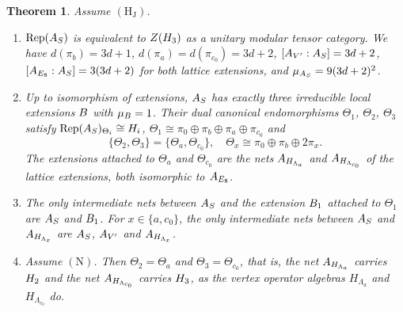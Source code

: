 \documentclass[leqno]{article}
\let\cal\relax
\newcommand{\cal}{\mathcal}
\DeclareMathOperator{\Rep}{Rep} %
\newtheorem{thm}{Theorem}[section]
\numberwithin{equation}{section}
\begin{document}
\begin{thm}
\label{thm:consequences}
Assume $\mathrm{(H_J)}$.
\begin{enumerate}
\item $\Rep(\cal A_S)$ is equivalent to $Z(\cal H_3)$ as a unitary modular tensor category. We have $d(\pi_b) = 3d+1$, $d(\pi_a) = d(\pi_{c_0}) = 3d+2$, $[\cal A_{V'} : \cal A_S] = 3d+2$, $[\cal A_{E_8} : \cal A_S] = 3(3d+2)$ for both lattice extensions, and $\mu_{\cal A_S} = 9(3d+2)^2$.
\item Up to isomorphism of extensions, $\cal A_S$ has exactly three irreducible local extensions $\cal B$ with $\mu_{\cal B} = 1$. Their dual canonical endomorphisms $\Theta_1$, $\Theta_2$, $\Theta_3$ satisfy $\Rep(\cal A_S)_{\Theta_i} \cong \cal H_i$, $\Theta_1 \cong \pi_0 \oplus \pi_b \oplus \pi_a \oplus \pi_{c_0}$ and
\[
\{\Theta_2,\Theta_3\} = \{\Theta_a,\Theta_{c_0}\},\quad \Theta_x \cong \pi_0 \oplus \pi_b \oplus 2\pi_x.
\]
The extensions attached to $\Theta_a$ and $\Theta_{c_0}$ are the nets $\cal A_{H_{\Lambda_a}}$ and $\cal A_{H_{\Lambda_{c_0}}}$ of the lattice extensions, both isomorphic to $\cal A_{E_8}$.
\item The only intermediate nets between $\cal A_S$ and the extension $\cal B_1$ attached to $\Theta_1$ are $\cal A_S$ and $\cal B_1$. For $x \in \{a,c_0\}$, the only intermediate nets between $\cal A_S$ and $\cal A_{H_{\Lambda_x}}$ are $\cal A_S$, $\cal A_{V'}$ and $\cal A_{H_{\Lambda_x}}$.
\item Assume $\mathrm{(N)}$. Then $\Theta_2 = \Theta_a$ and $\Theta_3 = \Theta_{c_0}$, that is, the net $\cal A_{H_{\Lambda_a}}$ carries $\cal H_2$ and the net $\cal A_{H_{\Lambda_{c_0}}}$ carries $\cal H_3$, as the vertex operator algebras $H_{\Lambda_a}$ and $H_{\Lambda_{c_0}}$ do.
\end{enumerate}
\end{thm}
\end{document}
